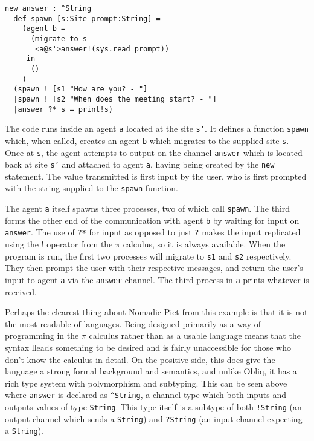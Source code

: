 \begin{verbatim}
new answer : ^String
  def spawn [s:Site prompt:String] =
    (agent b =
      (migrate to s
       <a@s'>answer!(sys.read prompt))
     in
      ()
    )
  (spawn ! [s1 "How are you? - "]
  |spawn ! [s2 "When does the meeting start? - "]
  |answer ?* s = print!s)
\end{verbatim}

The code runs inside an agent \texttt{a} located at the site
\texttt{s'}.  It defines a function \texttt{spawn} which, when called,
creates an agent \texttt{b} which migrates to the supplied site
\texttt{s}.  Once at \texttt{s}, the agent attempts to output on the
channel \texttt{answer} which is located back at site \texttt{s'} and
attached to agent \texttt{a}, having being created by the \texttt{new}
statement.  The value transmitted is first input by the user, who is
first prompted with the string supplied to the \texttt{spawn}
function.

The agent \texttt{a} itself spawns three processes, two of which call
\texttt{spawn}.  The third forms the other end of the communication
with agent \texttt{b} by waiting for input on \texttt{answer}.  The
use of \texttt{?*} for input as opposed to just \texttt{?} makes the
input replicated using the $!$ operator from the $\pi$ calculus, so it
is always available.  When the program is run, the first two processes
will migrate to \texttt{s1} and \texttt{s2} respectively.  They then
prompt the user with their respective messages, and return the user's
input to agent \texttt{a} via the \texttt{answer} channel.  The third
process in \texttt{a} prints whatever is received.

Perhaps the clearest thing about Nomadic Pict from this example is
that it is not the most readable of languages.  Being designed
primarily as a way of programming in the $\pi$ calculus rather than as
a usable language means that the syntax lleads something to be desired
and is fairly unaccessible for those who don't know the calculus in
detail.  On the positive side, this does give the language a strong
formal background and semantics, and unlike Obliq, it has a rich type
system with polymorphism and subtyping. This can be seen above where
\texttt{answer} is declared as \texttt{\textasciicircum String}, a channel type which
both inputs and outputs values of type \texttt{String}.  This type
itself is a subtype of both \texttt{!String} (an output channel which
sends a \texttt{String}) and \texttt{?String} (an input channel
expecting a \texttt{String}).

